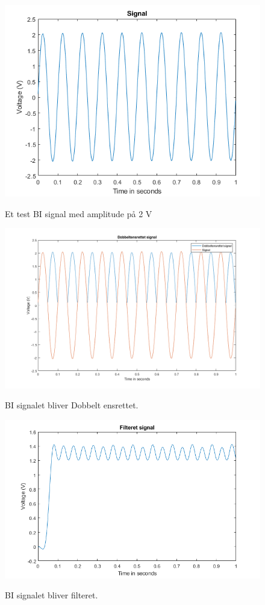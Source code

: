\begin{figure}[H] 
\centering
{\includegraphics[width=12cm]
{Figure/modultestprocessSignal}}
\caption{Et test BI signal med amplitude på 2 V}
\label{fig:modultestprocessSignal}
\end{figure}

\begin{figure}[H] 
\centering
{\includegraphics[width=12cm]
{Figure/modultestprocessEnsrettet}}
\caption{BI signalet bliver Dobbelt ensrettet.}
\label{fig:modultestprocessEnsrettet}
\end{figure}


\begin{figure}[H] 
\centering
{\includegraphics[width=12cm]
{Figure/modultestprocessFilter}}
\caption{BI signalet bliver filteret.}
\label{fig:modultestprocessFilter}
\end{figure}


